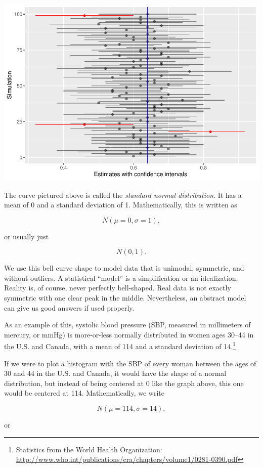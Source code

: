 \documentclass[
]{book}
\begin{document}
\includegraphics{intro_stats_files/figure-latex/unnamed-chunk-335-1.pdf}

The curve pictured above is called the \emph{standard normal distribution}. It has a mean of 0 and a standard deviation of 1. Mathematically, this is written as

\[
N(\mu = 0, \sigma = 1),
\]

or usually just

\[
N(0, 1).
\]

We use this bell curve shape to model data that is unimodal, symmetric, and without outliers. A statistical ``model'' is a simplification or an idealization. Reality is, of course, never perfectly bell-shaped. Real data is not exactly symmetric with one clear peak in the middle. Nevertheless, an abstract model can give us good answers if used properly.

As an example of this, systolic blood pressure (SBP, measured in millimeters of mercury, or mmHg) is more-or-less normally distributed in women ages 30--44 in the U.S. and Canada, with a mean of 114 and a standard deviation of 14.\footnote{Statistics from the World Health Organization: \url{http://www.who.int/publications/cra/chapters/volume1/0281-0390.pdf}}

If we were to plot a histogram with the SBP of every woman between the ages of 30 and 44 in the U.S. and Canada, it would have the shape of a normal distribution, but instead of being centered at 0 like the graph above, this one would be centered at 114. Mathematically, we write

\[
N(\mu = 114, \sigma = 14),
\]

or
\end{document}
